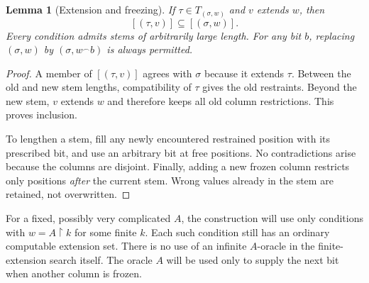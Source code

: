 \documentclass[11pt,a4paper]{article}
\newcommand{\pref}{\mathbin{\upharpoonright}}
\newcommand{\concat}{\mathbin{{}^{\frown}}}
\newtheorem{lemma}[theorem]{Lemma}
\theoremstyle{definition}\newtheorem{definition}[theorem]{Definition}
\theoremstyle{remark}\newtheorem{remark}[theorem]{Remark}
\begin{document}
\begin{lemma}[Extension and freezing]\label{lem:conditions}
If $\tau\in T_{(\sigma,w)}$ and $v$ extends $w$, then
\[
 [(\tau,v)]\subseteq[(\sigma,w)].
\]
Every condition admits stems of arbitrarily large length. For any bit $b$, replacing $(\sigma,w)$ by $(\sigma,w\concat b)$ is always permitted.
\end{lemma}
\begin{proof}
A member of $[(\tau,v)]$ agrees with $\sigma$ because it extends $\tau$. Between the old and new stem lengths, compatibility of $\tau$ gives the old restraints. Beyond the new stem, $v$ extends $w$ and therefore keeps all old column restrictions. This proves inclusion.

To lengthen a stem, fill any newly encountered restrained position with its prescribed bit, and use an arbitrary bit at free positions. No contradictions arise because the columns are disjoint. Finally, adding a new frozen column restricts only positions \emph{after} the current stem. Wrong values already in the stem are retained, not overwritten.
\end{proof}

For a fixed, possibly very complicated $A$, the construction will use only conditions with $w=A\pref k$ for some finite $k$. Each such condition still has an ordinary computable extension set. There is no use of an infinite $A$-oracle in the finite-extension search itself. The oracle $A$ will be used only to supply the next bit when another column is frozen.
\end{document}
